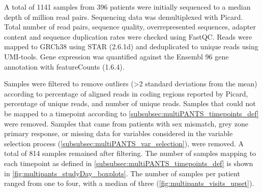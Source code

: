 A total of 1141 samples from 396 patients were initially sequenced to a median depth of  million read pairs.
Sequencing data was demultiplexed with Picard.
Total number of read pairs, sequence quality, overrepresented sequences, adapter content and sequence duplication rates were checked using FastQC.
%
Reads were mapped to GRCh38 using STAR (2.6.1d) and deduplicated to unique reads using UMI-tools.
Gene expression was quantified against the Ensembl 96 gene annotation with featureCounts (1.6.4).

Samples were filtered to remove outliers (\num{>2} standard deviations from the mean) according to percentage of aligned reads in coding regions reported by Picard, percentage of unique reads, and number of unique reads.
Samples that could not be mapped to a timepoint according to \cref{subsubsec:multiPANTS_timepoints_def} were removed.
Samples that came from patients with 
sex mismatch,
grey zone primary response, 
or missing data for variables considered in the variable selection process (\cref{subsubsec:multiPANTS_var_selection}),
were removed.
A total of 814 samples remained after filtering.
The number of samples mapping to each timepoint as defined in \cref{subsubsec:multiPANTS_timepoints_def} is shown in \cref{fig:multipants_studyDay_boxplots}.
The number of samples per patient ranged from one to four, with a median of three (\cref{fig:multipants_visits_upset}).

